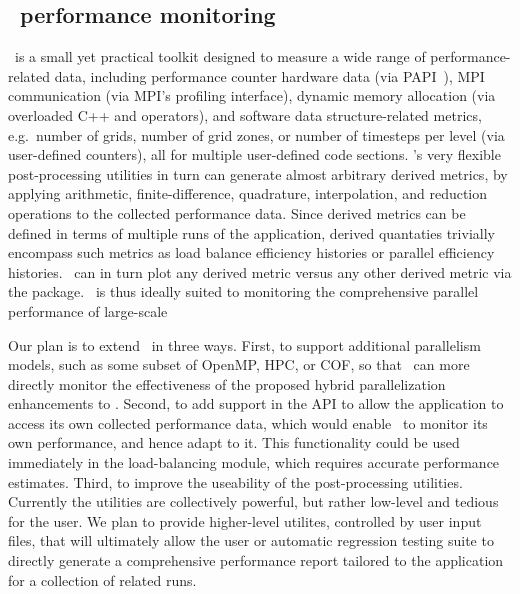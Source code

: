 \documentclass{article}
\begin{document}
\subsection{\lcaperf\ performance monitoring} \label{solution:performance-lcaperf}

\lcaperf\ is a small yet practical toolkit
 designed to measure a wide range of performance-related data,
 including performance counter hardware data (via PAPI~\cite{BrDo00}),
 MPI communication (via MPI's profiling interface), dynamic memory
 allocation (via overloaded C++  and 
 operators), and software data structure-related metrics, e.g.~number
 of grids, number of grid zones, or number of timesteps per level (via
 user-defined counters), all for multiple user-defined code sections.
 \lcaperf's very flexible post-processing utilities in turn can
 generate almost arbitrary derived metrics, by applying arithmetic,
 finite-difference, quadrature, interpolation, and reduction
 operations to the collected performance data.  Since derived metrics
 can be defined in terms of multiple runs of the application, derived
 quantaties trivially encompass such metrics as load balance
 efficiency histories or parallel efficiency histories.  \lcaperf\ can
 in turn plot any derived metric versus any other derived metric via
 the  package.  \lcaperf\ is thus ideally suited to
 monitoring the comprehensive parallel performance of large-scale

 Our plan is to extend \lcaperf\ in three ways.  First, to support
 additional parallelism models, such as some subset of OpenMP, HPC, or
 COF, so that \lcaperf\ can more directly monitor the effectiveness of
 the proposed hybrid parallelization enhancements to \enzo.  Second,
 to add support in the API to allow the application to access its own
 collected performance data, which would enable \enzo\ to monitor its
 own performance, and hence adapt to it.  This functionality could be
 used immediately in the load-balancing module, which requires
 accurate performance estimates.  Third, to improve the useability of
 the post-processing utilities.  Currently the utilities are
 collectively powerful, but rather low-level and tedious for the user.
 We plan to provide higher-level utilites, controlled by user input
 files, that will ultimately allow the user or automatic regression
 testing suite to directly generate a comprehensive performance report
 tailored to the application for a collection of related runs.
\end{document}
